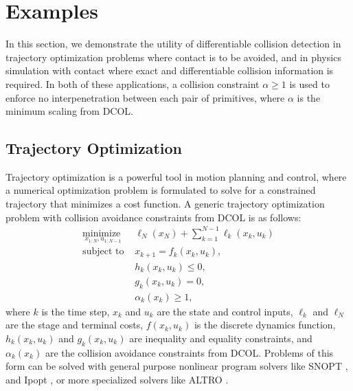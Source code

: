\section{Examples}\label{sec:dcol:examples}
In this section, we demonstrate the utility of differentiable collision detection in trajectory optimization problems where contact is to be avoided, and in physics simulation with contact where exact and differentiable collision information is required.  In both of these applications, a collision constraint $\alpha \geq 1$ is used to enforce no interpenetration between each pair of primitives, where $\alpha$ is the minimum scaling from DCOL.
\subsection{Trajectory Optimization}
Trajectory optimization is a powerful tool in motion planning and control, where a numerical optimization problem is formulated to solve for a constrained trajectory that minimizes a cost function.  A generic trajectory optimization problem with collision avoidance constraints from DCOL is as follows:
 \begin{equation}
	\begin{array}{ll}
	\underset{x_{1:N},u_{1:N-1}}{\mbox{minimize }} & \ell_N(x_N) + \sum_{k=1}^{N-1} \ell_k(x_k,u_k) \\
	\mbox{subject to } & x_{k+1} = f_k(x_k,u_k), \\
	                   & h_k(x_k,u_k) \leq 0, \\
                          & g_k(x_k,u_k) = 0, \\
                          & \alpha_k(x_k) \geq 1,
	\end{array} \label{eq:trajopt}
\end{equation}
where $k$ is the time step, $x_k$ and $u_k$ are the state and control inputs, $\ell_k$ and $\ell_N$ are the stage and terminal costs, $f(x_k,u_k)$ is the discrete dynamics function, $h_k(x_k,u_k)$ and $g_k(x_k,u_k)$ are inequality and equality constraints, and $\alpha_k(x_k)$ are the collision avoidance constraints from DCOL. Problems of this form can be solved with general purpose nonlinear program solvers like SNOPT \cite{gill2005}, and Ipopt \cite{wachter2006}, or more specialized solvers like ALTRO \cite{howell2019a,jackson2021c}. 

